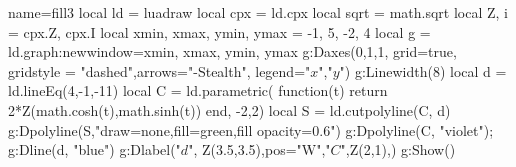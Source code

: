 \documentclass[border=2 mm]{standalone}
\begin{document}
\begin{luadraw}{name=fill3}
local ld = luadraw
local cpx = ld.cpx
local sqrt = math.sqrt
local Z, i = cpx.Z, cpx.I
local xmin, xmax, ymin, ymax = -1, 5, -2, 4
local g = ld.graph:new{window={xmin, xmax, ymin, ymax}}  
g:Daxes({0,1,1}, {grid=true, gridstyle = "dashed",arrows="-Stealth", legend={"$x$","$y$"}})
g:Linewidth(8)
local d = ld.lineEq(4,-1,-11)
local C = ld.parametric( function(t) return 2*Z(math.cosh(t),math.sinh(t)) end, -2,2)
local S = ld.cutpolyline(C, d)
g:Dpolyline(S,"draw=none,fill=green,fill opacity=0.6")
g:Dpolyline(C, "violet"); g:Dline(d, "blue")
g:Dlabel("$d$", Z(3.5,3.5),{pos="W"},"$C$",Z(2,1),{})
g:Show()
\end{luadraw}
\end{document}
